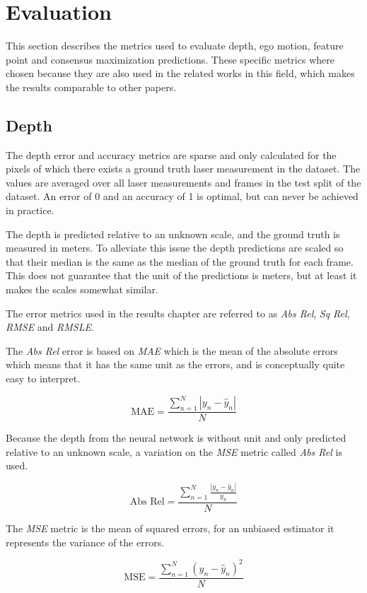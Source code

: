 \section{Evaluation}

This section describes the metrics used to evaluate depth, ego motion, feature point and consensus maximization predictions. These specific metrics where chosen because they are also used in the related works in this field, which makes the results comparable to other papers.

\subsection{Depth}

The depth error and accuracy metrics are sparse and only calculated for the pixels of which there exists a ground truth laser measurement in the dataset. The values are averaged over all laser measurements and frames in the test split of the dataset. An error of 0 and an accuracy of 1 is optimal, but can never be achieved in practice.

The depth is predicted relative to an unknown scale, and the ground truth is measured in meters. To alleviate this issue the depth predictions are scaled so that their median is the same as the median of the ground truth for each frame. This does not guarantee that the unit of the predictions is meters, but at least it makes the scales somewhat similar.

The error metrics used in the results chapter are referred to as \textit{Abs Rel}, \textit{Sq Rel}, \textit{RMSE} and \textit{RMSLE}.

The \textit{Abs Rel} error is based on \textit{MAE} which is the mean of the absolute errors which means that it has the same unit as the errors, and is conceptually quite easy to interpret.

\[
\textrm{MAE}=\frac{\sum^N_{n=1}{|y_n-\hat{y}_n|}}{N}
\]

Because the depth from the neural network is without unit and only predicted relative to an unknown scale, a variation on the \textit{MSE} metric called \textit{Abs Rel} is used.

\[
\textrm{Abs Rel}=\frac{\sum^N_{n=1}{\frac{|y_n-\hat{y}_n|}{y_n}}}{N}
\]

The \textit{MSE} metric is the mean of squared errors, for an unbiased estimator it represents the variance of the errors. 

\[
\textrm{MSE}=\frac{\sum^N_{n=1}{(y_n-\hat{y}_n)^2}}{N}
\]

